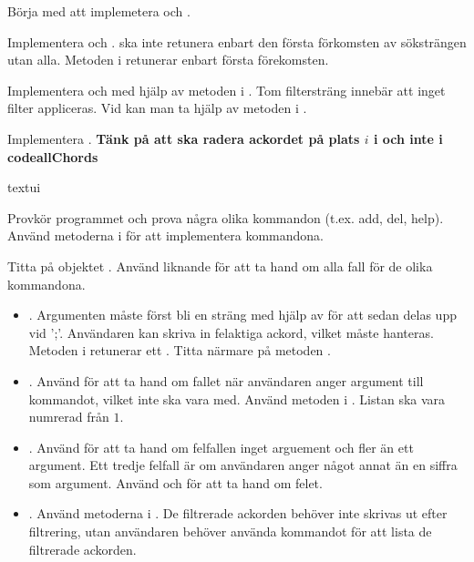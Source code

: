 {\Subtask Börja med att implemetera  och .

\Subtask Implementera  och .  ska inte retunera enbart den första förkomsten av söksträngen utan alla. Metoden  i  retunerar enbart första förekomsten.

\Subtask Implementera  och  med hjälp av metoden  i . Tom filtersträng innebär att inget filter appliceras. Vid  kan man ta hjälp av metoden  i .

\Subtask Implementera . \textbf{Tänk på att  ska radera ackordet på plats $i$ i  och inte i code{allChords}}

\Task textui

\Subtask Provkör programmet och prova några olika kommandon (t.ex. add, del, help). Använd metoderna i  för att implementera kommandona.

\Subtask Titta på objektet . Använd liknande  för att ta hand om alla fall för de olika kommandona.

\begin{itemize}
\item {}. Argumenten måste först bli en sträng med hjälp av  för att sedan delas upp vid ';'. Användaren kan skriva in felaktiga ackord, vilket måste hanteras. Metoden  i  retunerar ett . Titta närmare på metoden .

\item {}. Använd  för att ta hand om fallet när användaren anger argument till kommandot, vilket inte ska vara med. Använd metoden i . Listan ska vara numrerad från $1$.

\item {}. Använd  för att ta hand om felfallen inget arguement och fler än ett argument. Ett tredje felfall är om användaren anger något annat än en siffra som argument. Använd  och  för att ta hand om felet.

\item {}. Använd metoderna i . De filtrerade ackorden behöver inte skrivas ut efter filtrering, utan användaren behöver använda kommandot  för att lista de filtrerade ackorden.


\end{itemize}}
